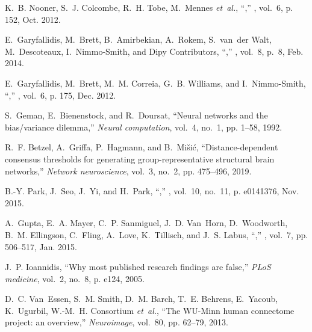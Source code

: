 \documentclass[10pt,letterpaper]{article}
\begin{document}
\begin{thebibliography}{10}
K.~B. Nooner, S.~J. Colcombe, R.~H. Tobe, M.~Mennes \emph{et~al.},
  ``,''
  \emph{}, vol.~6, p. 152, Oct. 2012.

E.~Garyfallidis, M.~Brett, B.~Amirbekian, A.~Rokem, S.~van~der Walt,
  M.~Descoteaux, I.~Nimmo-Smith, and {Dipy Contributors},
  ``,'' \emph{}, vol.~8, p.~8,
  Feb. 2014.

E.~Garyfallidis, M.~Brett, M.~M. Correia, G.~B. Williams, and I.~Nimmo-Smith,
  ``,'' \emph{}, vol.~6,
  p. 175, Dec. 2012.

S.~Geman, E.~Bienenstock, and R.~Doursat, ``Neural networks and the
  bias/variance dilemma,'' \emph{Neural computation}, vol.~4, no.~1, pp. 1--58,
  1992.

R.~F. Betzel, A.~Griffa, P.~Hagmann, and B.~Mi{\v{s}}i{\'c},
  ``Distance-dependent consensus thresholds for generating group-representative
  structural brain networks,'' \emph{Network neuroscience}, vol.~3, no.~2, pp.
  475--496, 2019.

B.-Y. Park, J.~Seo, J.~Yi, and H.~Park, ``,'' \emph{}, vol.~10, no.~11, p. e0141376, Nov. 2015.

A.~Gupta, E.~A. Mayer, C.~P. Sanmiguel, J.~D. Van~Horn, D.~Woodworth, B.~M.
  Ellingson, C.~Fling, A.~Love, K.~Tillisch, and J.~S. Labus,
  ``,''
  \emph{}, vol.~7, pp. 506--517, Jan.
  2015.

J.~P. Ioannidis, ``Why most published research findings are false,'' \emph{PLoS
  medicine}, vol.~2, no.~8, p. e124, 2005.

D.~C. Van~Essen, S.~M. Smith, D.~M. Barch, T.~E. Behrens, E.~Yacoub,
  K.~Ugurbil, W.-M.~H. Consortium \emph{et~al.}, ``The {WU-Minn} human
  connectome project: an overview,'' \emph{Neuroimage}, vol.~80, pp. 62--79,
  2013.


\end{thebibliography}
\end{document}
